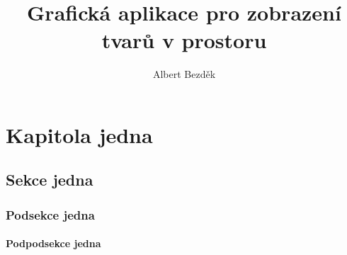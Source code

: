 \documentclass[a4paper, 12pt]{report}
\begin{document}
\title{Grafická aplikace pro zobrazení tvarů v prostoru}
\author{Albert Bezděk}
\maketitle
{}

\tableofcontents
\chapter{Kapitola jedna}
\section{Sekce jedna}
\subsection{Podsekce jedna}
\subsubsection{Podpodsekce jedna}

\blindtext[1]
\cite{wiki:xxx}


\begin{flushleft}
    
    
\end{flushleft}
\end{document}
